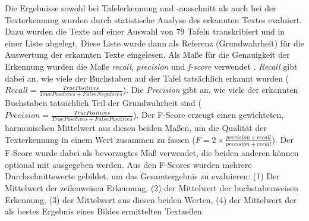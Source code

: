 Die Ergebnisse sowohl bei Tafelerkennung und -ausschnitt als auch bei der Texterkennung wurden durch statistische Analyse des erkannten Textes evaluiert. Dazu wurden die Texte auf einer Auswahl von 79 Tafeln transkribiert und in einer Liste abgelegt. Diese Liste wurde dann als Referenz (Grundwahrheit) für die Auswertung der erkannten Texte eingelesen.
Als Maße für die Genauigkeit der Erkennung wurden die Maße \textit{recall}, \textit{precision} und \textit{f-score} verwendet\cite{haraldklinke} \cite{qixiangye}. \textit{Recall} gibt dabei an, wie viele der Buchstaben auf der Tafel tatsächlich erkannt wurden ($Recall = \frac{True Positives}{True Positives + False Negatives}$). Die \textit{Precision} gibt an, wie viele der erkannten Buchstaben tatsächlich Teil der Grundwahrheit sind ($Precision = \frac{True Positives}{True Positives + False Positives}$). Der F-Score erzeugt einen gewichteten, harmonischen Mittelwert aus diesen beiden Maßen, um die Qualität der Texterkennung in einem Wert zusammen zu fassen ($F = 2 \times \frac{precision \times recall}{precision + recall}$). Der F-Score wurde dabei als bevorzugtes Maß verwendet, die beiden anderen können optional mit ausgegeben werden. Aus den F-Scores wurden mehrere Durchschnittswerte gebildet, um das Gesamtergebnis zu evaluieren: (1) Der Mittelwert der zeilenweisen Erkennung, (2) der Mittelwert der buchstabenweisen Erkennung, (3) der Mittelwert aus diesen beiden Werten, (4) der Mittelwert der als bestes Ergebnis eines Bildes ermittelten Textzeilen.